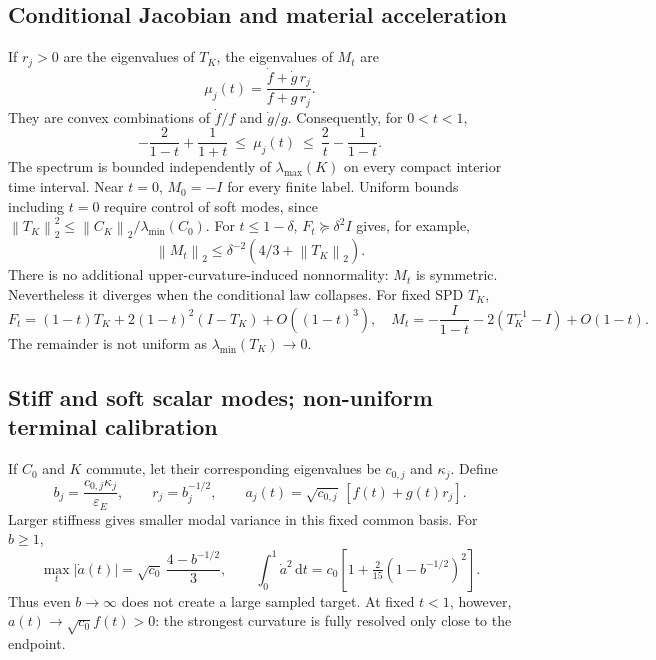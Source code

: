 \documentclass[11pt,letterpaper]{article}
\newcommand{\epsE}{\varepsilon_E}
\newcommand{\dd}{\,\mathrm d}
\newcommand{\norm}[1]{\left\lVert#1\right\rVert}
\begin{document}
\subsection{Conditional Jacobian and material acceleration}
If $r_j>0$ are the eigenvalues of $T_K$, the eigenvalues of $M_t$ are
\begin{equation}
\mu_j(t)=\frac{\dot f+\dot g\,r_j}{f+g\,r_j}.
\end{equation}
They are convex combinations of $\dot f/f$ and $\dot g/g$. Consequently, for $0<t<1$,
\begin{equation}
\boxed{-\frac2{1-t}+\frac1{1+t}\ \leq\ \mu_j(t)\ \leq\ \frac2t-\frac1{1-t}.}
\label{eq:jac-bound}
\end{equation}
The spectrum is bounded independently of $\lambda_{\max}(K)$ on every compact interior time interval. Near $t=0$, $M_0=-I$ for every finite label. Uniform bounds including $t=0$ require control of soft modes, since $\norm{T_K}_2^2\leq\norm{C_K}_2/\lambda_{\min}(C_0)$. For $t\leq1-\delta$, $F_t\succeq\delta^2I$ gives, for example,
\begin{equation}
\norm{M_t}_2\leq\delta^{-2}(4/3+\norm{T_K}_2).
\end{equation}
There is no additional upper-curvature-induced nonnormality: $M_t$ is symmetric. Nevertheless it diverges when the conditional law collapses. For fixed SPD $T_K$,
\begin{equation}
F_t=(1-t)T_K+2(1-t)^2(I-T_K)+O((1-t)^3),\quad
M_t=-\frac I{1-t}-2(T_K^{-1}-I)+O(1-t).
\label{eq:terminal-jac}
\end{equation}
The remainder is not uniform as $\lambda_{\min}(T_K)\to0$.

\subsection{Stiff and soft scalar modes; non-uniform terminal calibration}
If $C_0$ and $K$ commute, let their corresponding eigenvalues be $c_{0,j}$ and $\kappa_j$. Define
\begin{equation}
b_j=\frac{c_{0,j}\kappa_j}{\epsE},\qquad r_j=b_j^{-1/2},\qquad
a_j(t)=\sqrt{c_{0,j}}\,[f(t)+g(t)r_j].
\label{eq:scalar}
\end{equation}
Larger stiffness gives smaller modal variance in this fixed common basis. For $b\geq1$,
\begin{equation}
\max_t|\dot a(t)|=\sqrt{c_0}\,\frac{4-b^{-1/2}}3,\qquad
\int_0^1\dot a^2\dd t=c_0\left[1+\tfrac{2}{15}(1-b^{-1/2})^2\right].
\label{eq:stiff-scalar}
\end{equation}
Thus even $b\to\infty$ does not create a large sampled target. At fixed $t<1$, however, $a(t)\to\sqrt{c_0}f(t)>0$: the strongest curvature is fully resolved only close to the endpoint.
\end{document}
